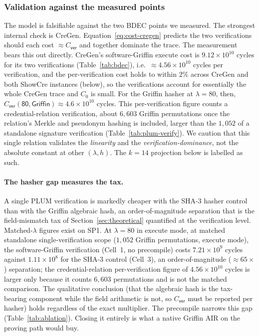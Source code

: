 \subsubsection{Validation against the measured points}
The model is falsifiable against the two BDEC points we measured. The strongest internal check is CreGen. Equation~\eqref{eq:cost-cregen} predicts the two verifications should each cost $\approx C_{\mathsf{ver}}$ and together dominate the trace. The measurement bears this out directly. CreGen's software-Griffin execute cost is $9.12\times10^{10}$ cycles for its two verifications (Table~\ref{tab:bdec}), i.e.\ $\approx4.56\times10^{10}$ cycles per verification, and the per-verification cost holds to within $2\%$ across CreGen and both ShowCre instances (below), so the verifications account for essentially the whole CreGen trace and $C_0$ is small. For the Griffin hasher at $\lambda=80$, then, $C_{\mathsf{ver}}(\textsf{80},\textsf{Griffin})\approx 4.6\times10^{10}$ cycles. This per-verification figure counts a credential-relation verification, about $6{,}603$ Griffin permutations once the relation's Merkle and pseudonym hashing is included, larger than the $1{,}052$ of a standalone signature verification (Table~\ref{tab:plum-verify}). We caution that this single relation validates the \emph{linearity} and the \emph{verification-dominance}, not the absolute constant at other $(\lambda,h)$. The $k=14$ projection below is labelled as such.

\paragraph{The hasher gap measures the tax.}
A single PLUM verification is markedly cheaper with the SHA-3 hasher control than with the Griffin algebraic hash, an order-of-magnitude separation that is the field-mismatch tax of Section~\ref{sec:theoretical} quantified at the verification level. Matched-$\lambda$ figures exist on SP1. At $\lambda=80$ in execute mode, at matched standalone single-verification scope ($1{,}052$ Griffin permutations, execute mode), the software-Griffin verification (Cell~1, no precompile) costs $7.21\times10^{9}$ cycles against $1.11\times10^{8}$ for the SHA-3 control (Cell~3), an order-of-magnitude (${\approx}65\times$) separation; the credential-relation per-verification figure of $4.56\times10^{10}$ cycles is larger only because it counts $6{,}603$ permutations and is not the matched comparison. The qualitative conclusion (that the algebraic hash is the tax-bearing component while the field arithmetic is not, so $C_{\mathsf{ver}}$ must be reported per hasher) holds regardless of the exact multiplier. The precompile narrows this gap (Table~\ref{tab:ablation}). Closing it entirely is what a native Griffin AIR on the proving path would buy.

